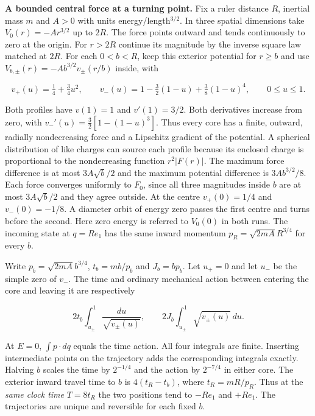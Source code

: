 \documentclass[11pt,a4paper]{article}
\begin{document}
\textbf{A bounded central force at a turning point.} Fix a ruler
distance \(R\), inertial mass \(m\) and \(A>0\) with units
energy/length\(^{3/2}\). In three spatial dimensions take
\(V_0(r)=-Ar^{3/2}\) up to \(2R\). The force points outward and tends
continuously to zero at the origin. For \(r>2R\) continue its magnitude
by the inverse square law matched at \(2R\). For each \(0<b<R\), keep
this exterior potential for \(r\ge b\) and use
\(V_{b,\pm}(r)=-A b^{3/2}v_\pm(r/b)\) inside, with

\[
 v_+(u)=\tfrac14+\tfrac34u^2,\qquad
 v_-(u)=1-\tfrac32(1-u)+\tfrac38(1-u)^4,\qquad 0\le u\le1.
\]

Both profiles have \(v(1)=1\) and \(v'(1)=3/2\). Both derivatives
increase from zero, with \(v_-'(u)=\tfrac32[1-(1-u)^3]\). Thus every
core has a finite, outward, radially nondecreasing force and a Lipschitz
gradient of the potential. A spherical distribution of like charges can
source each profile because its enclosed charge is proportional to the
nondecreasing function \(r^2|F(r)|\). The maximum force difference is at
most \(3A\sqrt b/2\) and the maximum potential difference is
\(3A b^{3/2}/8\). Each force converges uniformly to \(F_0\), since all
three magnitudes inside \(b\) are at most \(3A\sqrt b/2\) and they agree
outside. At the centre \(v_+(0)=1/4\) and \(v_-(0)=-1/8\). A diameter
orbit of energy zero passes the first centre and turns before the
second. Here zero energy is referred to \(V_0(0)\) in both runs. The
incoming state at \(q=R e_1\) has the same inward momentum
\(p_R=\sqrt{2mA}R^{3/4}\) for every \(b\).

Write \(p_b=\sqrt{2mA}b^{3/4}\), \(t_b=mb/p_b\) and \(J_b=bp_b\). Let
\(u_+=0\) and let \(u_-\) be the simple zero of \(v_-\). The time and
ordinary mechanical action between entering the core and leaving it are
respectively

\[
 2t_b\int_{u_\pm}^1\frac{du}{\sqrt{v_\pm(u)}},
 \qquad 2J_b\int_{u_\pm}^1\sqrt{v_\pm(u)}\,du .
\]

At \(E=0\), \(\int p\cdot dq\) equals the time action. All four
integrals are finite. Inserting intermediate points on the trajectory
adds the corresponding integrals exactly. Halving \(b\) scales the time
by \(2^{-1/4}\) and the action by \(2^{-7/4}\) in either core. The
exterior inward travel time to \(b\) is \(4(t_R-t_b)\), where
\(t_R=mR/p_R\). Thus at the \emph{same clock time} \(T=8t_R\) the two
positions tend to \(-Re_1\) and \(+Re_1\). The trajectories are unique
and reversible for each fixed \(b\).
\end{document}
